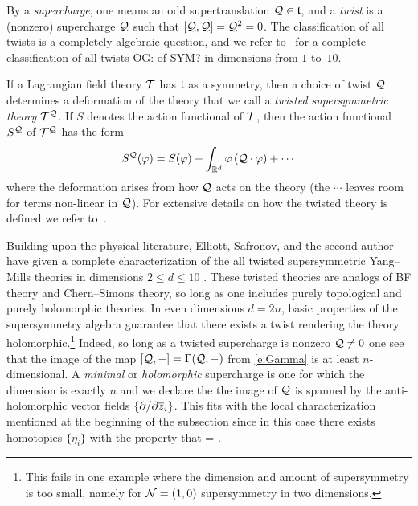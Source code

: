 \documentclass[11pt]{amsart}
\def\del{\partial}
\def\owen#1{{\textcolor{violet!65!black}{OG: {#1}}}}
\begin{document}
By a {\em supercharge}, one means an odd supertranslation $\mathcal Q \in \mathfrak t$, and
a {\em twist} is a (nonzero) supercharge $\mathcal Q$ such that $[\mathcal Q,\mathcal Q] = \mathcal Q^2 = 0$. 
The classification of all twists is a completely algebraic question,
and we refer to~\autocite{ESsusy} for a complete classification of all twists \owen{of SYM?} in dimensions from $1$ to~$10$. 

If a Lagrangian field theory $\mathcal T$ has $\mathfrak t$ as a symmetry, 
then a choice of twist $\mathcal Q$ determines a deformation of the theory that we call a {\em twisted supersymmetric theory} $\mathcal T^\mathcal Q$.
If $S$ denotes the action functional of $\mathcal T$, then the action functional $S^\mathcal Q$ of $\mathcal T^\mathcal Q$ has the form
\[
S^\mathcal Q(\varphi) = S(\varphi) + \int_{\mathbb R^d} \varphi  \left(\mathcal Q \cdot \varphi \right) + \cdots 
\]
where the deformation arises from how $\mathcal Q$ acts on the theory 
(the $\cdots$ leaves room for terms non-linear in $\mathcal Q$).
For extensive details on how the twisted theory is defined we refer to~\autocite{CostelloHolomorphic, ESW}. 

Building upon the physical literature, Elliott, Safronov, and the second author have given a complete characterization of the all twisted supersymmetric Yang--Mills theories in dimensions $2 \leq d \leq 10$ \autocite{ESW}. 
These twisted theories are analogs of BF theory and Chern--Simons theory, so long as one includes purely topological and purely holomorphic theories.
In even dimensions $d = 2n$, basic properties of the supersymmetry algebra guarantee that there exists a twist rendering the theory holomorphic.\footnote{This fails in one example where the dimension and amount of supersymmetry is too small, namely for $\mathcal N=(1,0)$ supersymmetry in two dimensions.}
Indeed, so long as a twisted supercharge is nonzero $\mathcal Q \ne 0$ one see that the image of the map $[\mathcal Q,-] = \Gamma(\mathcal Q,-)$ from \eqref{e:Gamma} is at least $n$-dimensional.
A {\em minimal} or {\em holomorphic} supercharge is one for which the dimension is exactly $n$ and we declare the the image of $\mathcal Q$ is spanned by the anti-holomorphic vector fields $\{\del / \del \zbar_i\}$.
This fits with the local characterization mentioned at the beginning of the subsection since in this case there exists homotopies $\{\eta_i\}$ with the property that 
\beqn
[\cQ,\eta_i] = \frac{\del}{\del \zbar_i} .
\eeqn 

\end{document}
